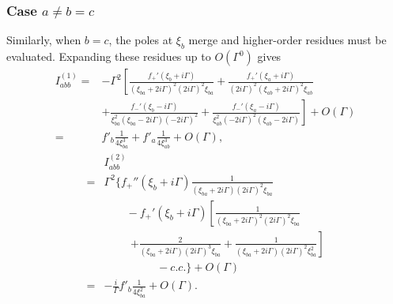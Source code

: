 \documentclass[twocolumn,superscriptaddress]{revtex4-1}
\begin{document}
\subsubsection{Case $a\neq b=c$}
Similarly, when $b=c$, the poles at $\xi_b$ merge and higher-order residues must be evaluated.
Expanding these residues up to $O(\Gamma^0)$ gives
\begin{align}
  I_{abb}^{(1)}
=& -\Gamma^2\left[
\frac{f_+'(\xi_b+i\Gamma)}{(\xi_{ba}+2i\Gamma)^2(2i\Gamma)^2\xi_{ba}}
+\frac{f_+'(\xi_a+i\Gamma)}{(2i\Gamma)^2(\xi_{ab}+2i\Gamma)^2\xi_{ab}}\right. \nonumber \\
&\left. 
+\frac{f_-'(\xi_b-i\Gamma)}{\xi_{ba}^2(\xi_{ba}-2i\Gamma)(-2i\Gamma)^2}
+\frac{f_-'(\xi_a-i\Gamma)}{\xi_{ab}^2(-2i\Gamma)^2(\xi_{ab}-2i\Gamma)}
\right] +O(\Gamma) \nonumber \\
= &
f'_b\frac{1}{4\xi_{ba}^3}
+
f'_a\frac{1}{4\xi_{ab}^3}+O(\Gamma),
\end{align}
\begin{align}
  &I_{abb}^{(2)}\nonumber \\
= &\Gamma^2\Bigg\{
f_+''(\xi_b+i\Gamma)\frac{1}{(\xi_{ba}+2i\Gamma)(2i\Gamma)^2\xi_{ba}} \nonumber \\
&\qquad
-f_+'(\xi_b+i\Gamma)\left[
\frac{1}{(\xi_{ba}+2i\Gamma)^2(2i\Gamma)^2\xi_{ba}}\right. \nonumber \\
&\hspace{1cm}\left.
+\frac{2}{(\xi_{ba}+2i\Gamma)(2i\Gamma)^3\xi_{ba}}
+\frac{1}{(\xi_{ba}+2i\Gamma)(2i\Gamma)^2\xi_{ba}^2}
\right]\nonumber \\
&\hspace{2cm}-c.c.\Bigg\}+O(\Gamma)\nonumber \\
=& -\frac{i}{\Gamma}f'_b\frac{1}{4\xi_{ba}^2}+O(\Gamma).
\end{align}
\end{document}
